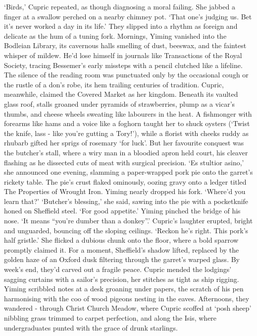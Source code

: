 `Birds,' Cupric repeated, as though diagnosing a moral failing. She jabbed a finger at a swallow perched on a nearby chimney pot. `That one's judging us. Bet it's never worked a day in its life.'
They slipped into a rhythm as foreign and delicate as the hum of a tuning fork. Mornings, Yiming vanished into the Bodleian Library, its cavernous halls smelling of dust, beeswax, and the faintest whisper of mildew. He'd lose himself in journals like Transactions of the Royal Society, tracing Bessemer's early missteps with a pencil clutched like a lifeline. The silence of the reading room was punctuated only by the occasional cough or the rustle of a don's robe, its hem trailing centuries of tradition.
Cupric, meanwhile, claimed the Covered Market as her kingdom. Beneath its vaulted glass roof, stalls groaned under pyramids of strawberries, plump as a vicar's thumbs, and cheese wheels sweating like labourers in the heat. A fishmonger with forearms like hams and a voice like a foghorn taught her to shuck oysters (`Twist the knife, lass - like you're gutting a Tory!'), while a florist with cheeks ruddy as rhubarb gifted her sprigs of rosemary `for luck'. But her favourite conquest was the butcher's stall, where a wiry man in a bloodied apron held court, his cleaver flashing as he dissected cuts of meat with surgical precision.
`Es stultior asino,' she announced one evening, slamming a paper-wrapped pork pie onto the garret's rickety table. The pie's crust flaked ominously, oozing gravy onto a ledger titled The Properties of Wrought Iron.
Yiming nearly dropped his fork. `Where'd you learn that?'
`Butcher's blessing,' she said, sawing into the pie with a pocketknife honed on Sheffield steel. `For good appetite.'
Yiming pinched the bridge of his nose. `It means ``you're dumber than a donkey''.'
Cupric's laughter erupted, bright and unguarded, bouncing off the sloping ceilings. `Reckon he's right. This pork's half gristle.' She flicked a dubious chunk onto the floor, where a bold sparrow promptly claimed it.
For a moment, Sheffield's shadow lifted, replaced by the golden haze of an Oxford dusk filtering through the garret's warped glass.
By week's end, they'd carved out a fragile peace. Cupric mended the lodgings' sagging curtains with a sailor's precision, her stitches as tight as ship rigging. Yiming scribbled notes at a desk groaning under papers, the scratch of his pen harmonising with the coo of wood pigeons nesting in the eaves. Afternoons, they wandered - through Christ Church Meadow, where Cupric scoffed at `posh sheep' nibbling grass trimmed to carpet perfection, and along the Isis, where undergraduates punted with the grace of drunk starlings.
